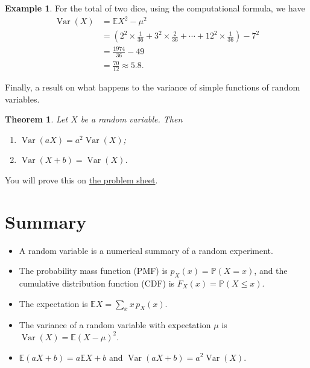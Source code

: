 \documentclass[
  a4paper,
]{book}
\providecommand{\tightlist}{%
  \setlength{\itemsep}{0pt}\setlength{\parskip}{0pt}}
\newtheorem{theorem}{Theorem}[chapter]
\theoremstyle{definition}
\theoremstyle{definition}
\newtheorem{example}{Example}[chapter]
\theoremstyle{definition}
\theoremstyle{definition}
\theoremstyle{remark}
\begin{document}
\begin{example}
For the total of two dice, using the computational formula, we have
\begin{align*}
\operatorname{Var}(X) &= \mathbb EX^2 - \mu^2 \\
        &= \left(2^2 \times \frac{1}{36} + 3^2 \times \frac{2}{36} + \cdots + 12^2 \times \frac{1}{36}\right) - 7^2 \\
        &= \frac{1974}{36} - 49 \\
        &= \frac{70}{12} \approx 5.8 .
\end{align*}
\end{example}

Finally, a result on what happens to the variance of simple functions of random variables.

\begin{theorem}

Let \(X\) be a random variable. Then

\begin{enumerate}
\def\labelenumi{\arabic{enumi}.}
\tightlist
\item
  \(\operatorname{Var}(aX) = a^2\operatorname{Var}(X)\);
\item
  \(\operatorname{Var}(X + b) = \operatorname{Var}(X)\).
\end{enumerate}

\end{theorem}

You will prove this on \protect\hyperlink{P3}{the problem sheet}.

\hypertarget{summary-05}{%
\section*{Summary}\label{summary-05}}

\begin{itemize}
\tightlist
\item
  A random variable is a numerical summary of a random experiment.
\item
  The probability mass function (PMF) is \(p_X(x) = \mathbb P(X = x)\), and the cumulative distribution function (CDF) is \(F_X(x) = \mathbb P(X \leq x)\).
\item
  The expectation is \(\mathbb EX = \sum_x x\, p_X(x)\).
\item
  The variance of a random variable with expectation \(\mu\) is \(\operatorname{Var}(X) = \mathbb E(X - \mu)^2\).
\item
  \(\mathbb E(aX+b) = a\mathbb EX + b\) and \(\operatorname{Var}(aX+b) = a^2\operatorname{Var}(X)\).
\end{itemize}
\end{document}
